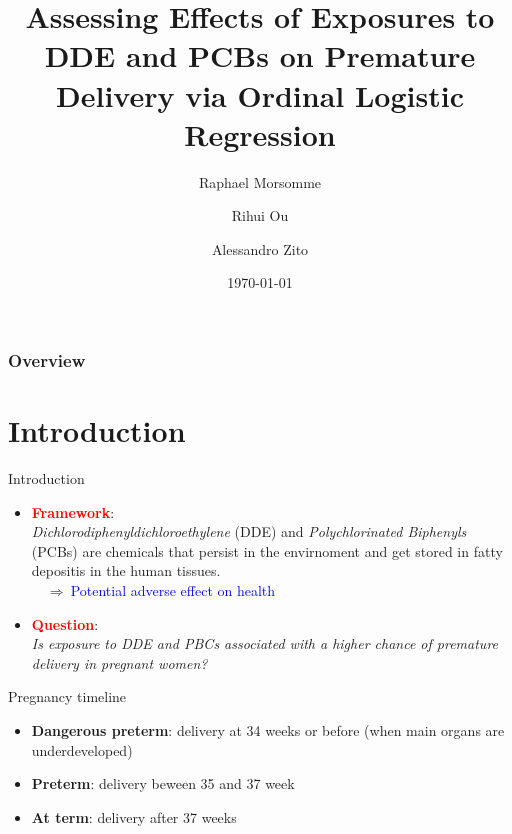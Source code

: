 \documentclass{beamer}
\title[DDE and PCB effect on Premature delivery]{Assessing Effects of Exposures to DDE and PCBs on Premature Delivery via Ordinal Logistic Regression} %
\author[Morsomme, Ou, Zito]{Raphael Morsomme \and Rihui Ou \and Alessandro Zito}
\institute[Stat 723]{Case Study 1 - Stat 723}
\date{\today} %
\begin{document}
	
	\begin{frame}
	\titlepage %
	\end{frame}

\begin{frame}
	\frametitle{Overview} %
	\tableofcontents %
\end{frame}


\section{Introduction}
\begin{frame}{Introduction}
\begin{itemize}
	\item \textcolor{red}{\textbf{Framework}}: \\
	\textit{Dichlorodiphenyldichloroethylene} (DDE) and \textit{Polychlorinated Biphenyls} (PCBs) 
	are chemicals that persist in the envirnoment and get stored in fatty depositis in the human tissues.\\
	$\quad \Longrightarrow \ $\textcolor{blue}{Potential adverse effect on health}
	\item \textcolor{red}{\textbf{Question}}:\\
	\textit{Is exposure to DDE and PBCs associated with a higher chance of premature delivery in pregnant women?}
\end{itemize}
\begin{block}{Pregnancy timeline}
	\begin{itemize}
		\item \textbf{Dangerous preterm}:  delivery at 34 weeks or before (when main organs are underdeveloped)
		\item \textbf{Preterm}: delivery beween 35 and 37 week
		\item \textbf{At term}: delivery after 37 weeks
	\end{itemize}
\end{block}
\end{frame}
\end{document}
